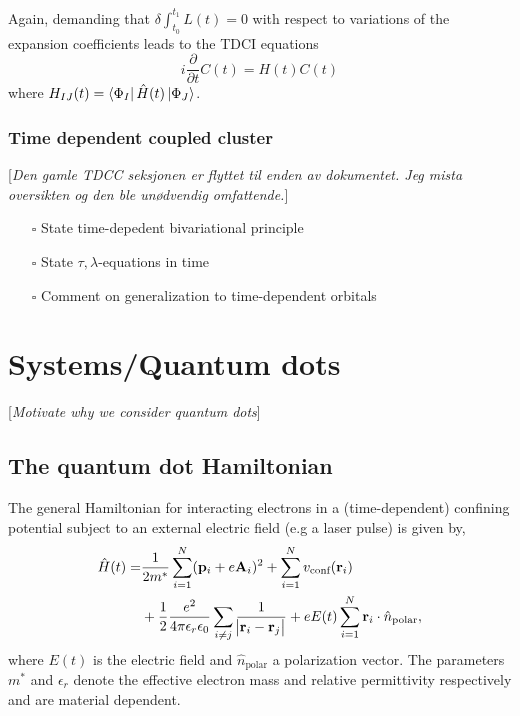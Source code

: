 \documentclass[aip,jcp,reprint,floatfix]{revtex4-1}
\newcommand \mycomment[1]   {{\color{red} [{\it {#1}}]}}
\newcommand{\todo}{$\square$}
\begin{document}
    Again, demanding that $\delta \int_{t_0}^{t_1} L(t) = 0$ with respect to variations of the expansion coefficients leads to the TDCI equations\cite{Hochstuhl2014}
    \begin{equation}
        i\frac{\partial}{\partial t} C(t) = H(t) C(t)
    \end{equation}
    where $H_{IJ}(t) = \bra{\Phi_I}\hat{H}(t) \ket{\Phi_J}$.

\subsubsection{Time dependent coupled cluster}
\mycomment{Den gamle TDCC seksjonen er flyttet til enden av dokumentet. Jeg mista oversikten og den ble unødvendig omfattende.}
\begin{itemize}
    \item [\todo] State time-depedent bivariational principle
    \item [\todo] State $\tau,\lambda$-equations in time 
    \item [\todo] Comment on generalization to time-dependent orbitals
\end{itemize}


\section{Systems/Quantum dots}
    \mycomment{Motivate why we consider quantum dots}
    \subsection{The quantum dot Hamiltonian}
    The general Hamiltonian for interacting electrons in a (time-dependent) confining potential subject to an external electric field (e.g a laser pulse) is given by,
    \begin{equation}
        \begin{aligned}
            \hat{H}(t) =& \frac{1}{2m^*} \sum_{i=1}^N (\vb{p}_i + e \vb{A}_i)^2
                 +  \sum_{i=1}^N v_\text{conf}(\mathbf{r}_i) \\
                 &+ \frac{1}{2}\frac{e^2}{4\pi\epsilon_r\epsilon_0} 
                    \sum_{i \neq j} \frac{1}{\abs{\vb{r}_i - \vb{r}_j}}
                + eE(t) \sum_{i=1}^N \vb{r}_i \cdot \hat{n}_{\text{polar}},
        \end{aligned}
    \end{equation}
    where $E(t)$ is the electric field and $\hat{n}_{\text{polar}}$ a polarization vector. The parameters $m^*$ and $\epsilon_r$ denote the effective electron mass and relative permittivity respectively and are material dependent.  
    
\end{document}
